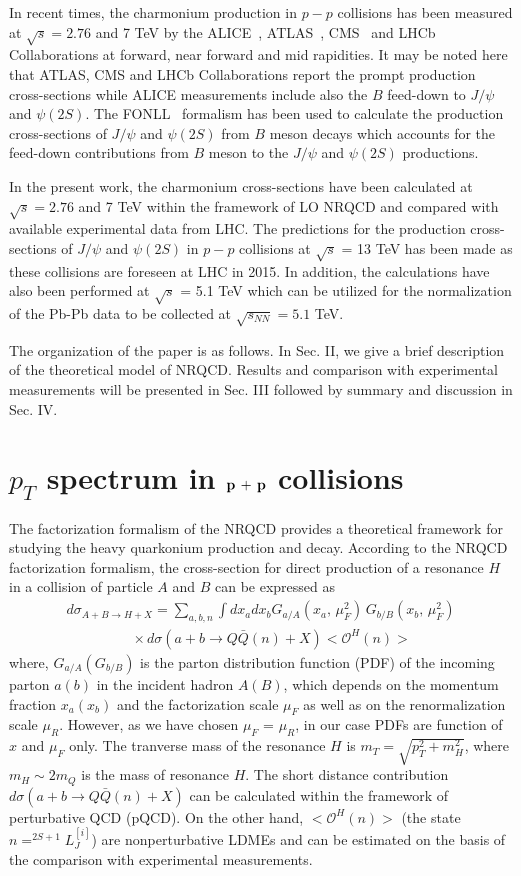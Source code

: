 \documentclass{iopart}
\def  \bea  {\begin{eqnarray}}
\def  \eea  {\end{eqnarray}}
\def  \nn   {\nonumber}
\begin{document}
In recent times, the charmonium production in $p-p$ collisions has been measured at $\sqrt{s} = 2.76$ and 7 TeV by the ALICE~\cite{plb718,epjc}, ATLAS~\cite{npb850}, CMS~\cite{jhep02} and LHCb~\cite{epjc71,epjc72,jhep041} Collaborations at forward, near forward and mid rapidities. 
It may be noted here that ATLAS, CMS and LHCb Collaborations report the prompt production cross-sections while ALICE measurements include also the $B$ feed-down to $J/\psi$ and $\psi(2S)$. The FONLL~\cite{jhep9805,jhep0103} formalism has been used to calculate the production cross-sections of $J/\psi$ and $\psi(2S)$ from $B$ meson decays which accounts for the feed-down contributions from $B$ meson to the $J/\psi$ and $\psi(2S)$ productions.

In the present work, the charmonium cross-sections have been calculated at $\sqrt{s} = 2.76$ and 7 TeV within the framework of LO NRQCD and compared with available experimental data from LHC. The predictions for the production cross-sections of $J/\psi$ and $\psi(2S)$ in $p-p$ collisions at $\sqrt{s}$ = 13 TeV has been made as these collisions are foreseen at LHC in 2015. In addition, the calculations have also been performed at $\sqrt{s}$ = 5.1 TeV which can be utilized for the normalization of the Pb-Pb data to be collected at $\sqrt{s_{NN}} = 5.1$ TeV.


The organization of the paper is as follows. In Sec. II, we give a brief description of the theoretical model of NRQCD. Results and comparison with experimental measurements will be presented in Sec. III followed by summary and discussion in Sec. IV.





\section{$p_T$ spectrum in $\bf p\,+\,p$ collisions}
The factorization formalism of the NRQCD  provides a theoretical framework for studying the heavy quarkonium production and decay. According to the NRQCD
factorization  formalism, the cross-section for direct production of a resonance $H$ in a collision of particle $A$ and $B$ can be expressed as 
\bea
d\sigma_{A+B\rightarrow H+X} = \sum_{a,b,n}\int dx_a dx_b  G_{a/A}(x_a,\,\mu^{2}_{F})
\, G_{b/B}(x_b,\,\mu^{2}_{F})\nn\\
~~~~~~~~~~~~~~~~~~~~~\times d\sigma(a+b\rightarrow Q\bar Q(n) +X)<\mathcal{O}^H(n)>
\eea
where, $G_{a/A}(G_{b/B})$ is the parton distribution function (PDF) of the incoming parton $a(b)$ in the incident hadron $A(B)$, which depends on 
the momentum fraction $x_a(x_b)$ and the factorization scale $\mu_F$ as well as on the renormalization scale $\mu_R$. However, as we have chosen $\mu_F$ = $\mu_R$, in our case PDFs are function of $x$ and $\mu_F$ only. The tranverse mass of the resonance $H$ is $m_T = \sqrt{p_T^2 + m_H^2}$,
where $m_H\sim2m_Q$ is the mass of resonance $H$. The short distance contribution $d\sigma(a+b\rightarrow Q\bar Q(n) +X)$ 
can be calculated within the framework of perturbative QCD (pQCD). On the other hand, $<\mathcal{O}^H(n)>$ (the state $n=^{2S+1}L^{[i]}_J$) are nonperturbative LDMEs and can be estimated on the basis of the comparison with experimental measurements.
\end{document}
